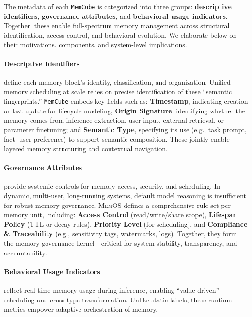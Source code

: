 \documentclass[]{memtensor}
\begin{document}
The metadata of each \texttt{MemCube} is categorized into three groups: \textbf{descriptive identifiers}, \textbf{governance attributes}, and \textbf{behavioral usage indicators}. Together, these enable full-spectrum memory management across structural identification, access control, and behavioral evolution. We elaborate below on their motivations, components, and system-level implications.

\paragraph{\textbf{Descriptive Identifiers}} define each memory block's identity, classification, and organization. Unified memory scheduling at scale relies on precise identification of these “semantic fingerprints.” \texttt{MemCube} embeds key fields such as: \textbf{Timestamp}, indicating creation or last update for lifecycle modeling; \textbf{Origin Signature}, identifying whether the memory comes from inference extraction, user input, external retrieval, or parameter finetuning; and \textbf{Semantic Type}, specifying its use (e.g., task prompt, fact, user preference) to support semantic composition. These jointly enable layered memory structuring and contextual navigation.

\paragraph{\textbf{Governance Attributes}} provide systemic controls for memory access, security, and scheduling. In dynamic, multi-user, long-running systems, default model reasoning is insufficient for robust memory governance. \textsc{MemOS} defines a comprehensive rule set per memory unit, including: \textbf{Access Control} (read/write/share scope), \textbf{Lifespan Policy} (TTL or decay rules), \textbf{Priority Level} (for scheduling), and \textbf{Compliance \& Traceability} (e.g., sensitivity tags, watermarks, logs). Together, they form the memory governance kernel—critical for system stability, transparency, and accountability.

\paragraph{\textbf{Behavioral Usage Indicators}} reflect real-time memory usage during inference, enabling “value-driven” scheduling and cross-type transformation. Unlike static labels, these runtime metrics empower adaptive orchestration of memory.
\end{document}

